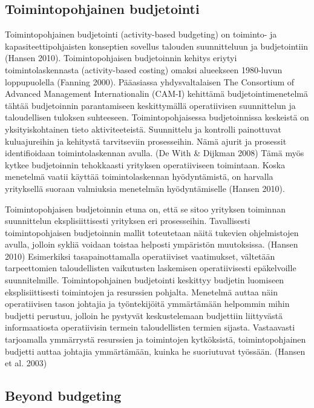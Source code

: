 \documentclass[12pt,a4paper,oneside,pdftex]{report}
\begin{document}
\subsection{Toimintopohjainen budjetointi}

Toimintopohjainen budjetointi (activity-based budgeting) on toiminto- ja kapasiteettipohjaisten konseptien sovellus talouden suunnitteluun ja budjetointiin (Hansen 2010). Toimintopohjaisen budjetoinnin kehitys eriytyi toimintolaskennasta (activity-based costing) omaksi alueekseen 1980-luvun loppupuolella (Fanning 2000). Pääasiassa yhdysvaltalaisen The Consortium of Advanced Management Internationalin (CAM-I) kehittämä budjetointimenetelmä tähtää budjetoinnin parantamiseen keskittymällä operatiivisen suunnittelun ja taloudellisen tuloksen suhteeseen. Toimintopohjaisessa budjetoinnissa keskeistä on yksityiskohtainen tieto aktiviteeteistä. Suunnittelu ja kontrolli painottuvat kuluajureihin ja kehitystä tarvitseviin prosesseihin. Nämä ajurit ja prosessit identifioidaan toimintolaskennan avulla. (De With & Dijkman 2008) Tämä myös kytkee budjetoinnin tehokkaasti yrityksen operatiiviseen toimintaan. Koska menetelmä vaatii käyttää toimintolaskennan hyödyntämistä, on harvalla yrityksellä suoraan valmiuksia menetelmän hyödyntämiselle (Hansen 2010).

Toimintopohjaisen budjetoinnin etuna on, että se sitoo yrityksen toiminnan suunnittelun eksplisiittisesti yrityksen eri prosesseihin. Tavallisesti toimintopohjaisen budjetoinnin mallit toteutetaan näitä tukevien ohjelmistojen avulla, jolloin sykliä voidaan toistaa helposti ympäristön muutoksissa. (Hansen 2010) Esimerkiksi tasapainottamalla operatiiviset vaatimukset, vältetään tarpeettomien taloudellisten vaikutusten laskemisen operatiivisesti epäkelvoille suunnitelmille. Toimintopohjainen budjetointi keskittyy budjetin luomiseen eksplisiittisesti toimintojen ja resurssien pohjalta. Menetelmä auttaa näin operatiivisen tason johtajia ja työntekijöitä ymmärtämään helpommin mihin budjetti perustuu, jolloin he pystyvät keskustelemaan budjettiin liittyvästä informaatiosta operatiivisin termein taloudellisten termien sijasta. Vastaavasti tarjoamalla ymmärrystä resurssien ja toimintojen kytköksistä, toimintopohjainen budjetti auttaa johtajia ymmärtämään, kuinka he suoriutuvat työssään. (Hansen et al. 2003)

\subsection{Beyond budgeting}
\end{document}

